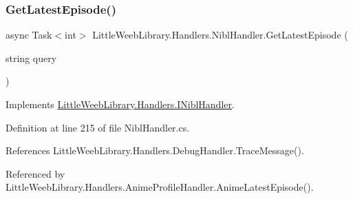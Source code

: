 \subsubsection{\texorpdfstring{Get\+Latest\+Episode()}{GetLatestEpisode()}}
{\footnotesize\ttfamily async Task$<$int$>$ Little\+Weeb\+Library.\+Handlers.\+Nibl\+Handler.\+Get\+Latest\+Episode (\begin{DoxyParamCaption}\item[{string}]{query }\end{DoxyParamCaption})}



Implements \mbox{\hyperlink{interface_little_weeb_library_1_1_handlers_1_1_i_nibl_handler_a7e3c7dc7ba9a01c39d125dc0a759d606}{Little\+Weeb\+Library.\+Handlers.\+I\+Nibl\+Handler}}.



Definition at line 215 of file Nibl\+Handler.\+cs.



References Little\+Weeb\+Library.\+Handlers.\+Debug\+Handler.\+Trace\+Message().



Referenced by Little\+Weeb\+Library.\+Handlers.\+Anime\+Profile\+Handler.\+Anime\+Latest\+Episode().


